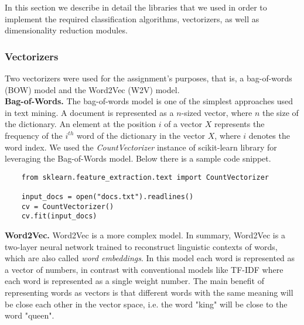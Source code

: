 In this section we describe in detail the libraries that we used in order to implement the required classification algorithms, vectorizers, as well as dimensionality reduction modules.
%
\subsubsection{Vectorizers}
Two vectorizers were used for the assignment’s purposes, that is, a bag-of-words (BOW) model and the Word2Vec (W2V) model.
\\
\textbf{Bag-of-Words.} The bag-of-words\cite{BoW} model is one of the simplest approaches used in text mining. A document is represented as a $n$-sized vector, where $n$ the size of the dictionary. An element at the position $i$ of a vector $X$ represents the frequency of the $i^{th}$ word of the dictionary in the vector $X$, where $i$ denotes the word index. We used the \emph{CountVectorizer} instance of scikit-learn library for leveraging the Bag-of-Words model. Below there is a sample code snippet.
\begin{verbatim}
	from sklearn.feature_extraction.text import CountVectorizer
	
	input_docs = open("docs.txt").readlines()
	cv = CountVectorizer()
	cv.fit(input_docs)
\end{verbatim}
%
\textbf{Word2Vec.} Word2Vec\cite{mikolov2013distributed} is a more complex model. In summary, Word2Vec is a two-layer neural network trained to reconstruct linguistic contexts of words, which are also called \emph{word embeddings}\cite{WordEmbedding}. In this model each word is represented as a vector of numbers, in contrast with conventional models like TF-IDF where each word is represented as a single weight number. The main benefit of representing words as vectors is that different words with the same meaning will be close each other in the vector space, i.e. the word "king" will be close to the word "queen".

